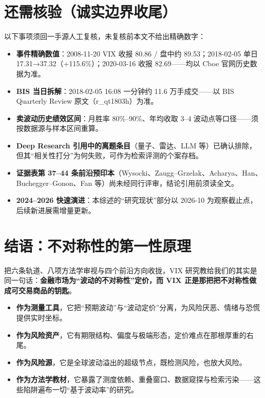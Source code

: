 \documentclass[11pt,a4paper]{article}
\begin{document}
\newpage
\section{还需核验（诚实边界收尾）}

以下事项须回一手源人工复核，未复核前本文不给出精确数字：

\begin{itemize}[leftmargin=2.2em]
  \item \textbf{事件精确数值}：2008-11-20 VIX 收报 80.86 / 盘中约 89.53；2018-02-05 单日 17.31→37.32（+115.6\%）；2020-03-16 收报 82.69——均以 Cboe 官网历史数据为准。
  \item \textbf{BIS 当日拆解}：2018-02-05 16:08 一分钟约 11.6 万手成交——以 BIS Quarterly Review 原文（r\_qt1803h）为准。
  \item \textbf{卖波动历史绩效区间}：月胜率 80\%--90\%、年均收取 3--4 波动点等口径——须按数据源与样本区间重算。
  \item \textbf{Deep Research 引用中的离题条目}（量子、雷达、LLM 等）已确认排除，但其“相关性打分”为何失败，可作为检索评测的个案存档。
  \item \textbf{证据表第 37--44 条前沿预印本}（Wysocki、Zaugg--Grzelak、Acharya、Han、Buchegger--Gonon、Fan 等）尚未经同行评审，结论引用前须读全文。
  \item \textbf{2024--2026 快速演进}：本综述的“研究现状”部分以 2026-10 为观察截止点，后续新进展需增量更新。
\end{itemize}

\newpage
\section{结语：不对称性的第一性原理}

把六条轨道、八项方法学审视与四个前沿方向收拢，VIX 研究教给我们的其实是同一句话：\textbf{金融市场为“波动的不对称性”定价，而 VIX 正是那把把不对称性做成可交易商品的钥匙}。

\begin{itemize}[leftmargin=2.2em]
  \item \textbf{作为测量工具}，它把“预期波动”与“波动定价”分离，为风险厌恶、情绪与恐慌提供实时坐标。
  \item \textbf{作为风险资产}，它有期限结构、偏度与极端形态，定价难点在那根厚重的右尾。
  \item \textbf{作为风险源}，它是全球波动溢出的超级节点，既检测风险，也放大风险。
  \item \textbf{作为方法学教材}，它暴露了测度依赖、重叠窗口、数据窥探与检索污染——这些陷阱遍布一切“基于波动率”的研究。
\end{itemize}
\end{document}
